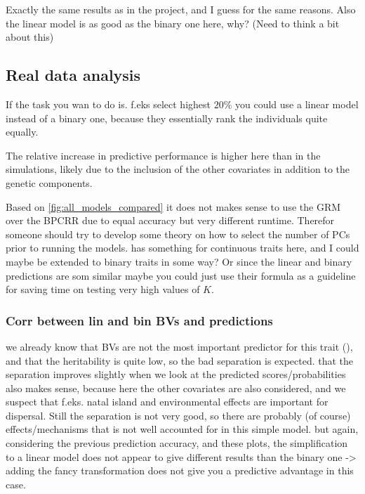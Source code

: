 Exactly the same results as in the project, and I guess for the same reasons. Also the linear model is as good as the binary one here, why? (Need to think a bit about this)  

\subsection{Real data analysis}

If the task you wan to do is. f.eks select highest $20\%$ you could use a linear model instead of a binary one, because they essentially rank the individuals quite equally.

The relative increase in predictive performance is higher here than in the simulations, likely due to the inclusion of the other covariates in addition to the genetic components. 

Based on \autoref{fig:all_models_compared} it does not makes sense to use the GRM over the BPCRR due to equal accuracy but very different runtime. Therefor someone should try to develop some theory on how to select the number of PCs prior to running the models. \textcite{aspheim_bayesian_2024} has something for continuous traits here, and I could maybe be extended to binary traits in some way? Or since the linear and binary predictions are som similar maybe you could just use their formula as a guideline for saving time on testing very high values of $K$. 


\subsubsection{Corr between lin and bin BVs and predictions}

we already know that BVs are not the most important predictor for this trait (\cite{saatoglu_genetic_2024}), and that the heritability is quite low, so the bad separation is expected. that the separation improves slightly when we look at the predicted scores/probabilities also makes sense, because here the other covariates are also considered, and we suspect that f.eks. natal island and environmental effects are important for dispersal. Still the separation is not very good, so there are probably (of course) effects/mechanisms that is not well accounted for in this simple model. but again, considering the previous prediction accuracy, and these plots, the simplification to a linear model does not appear to give different results than the binary one -> adding the fancy transformation does not give you a predictive advantage in this case. 

